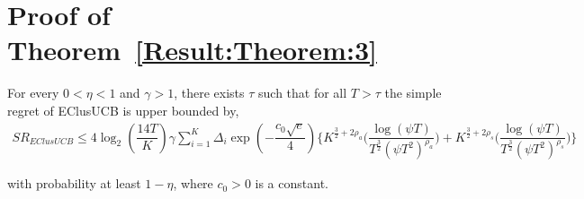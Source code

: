 

\section{Proof of Theorem~\ref{Result:Theorem:3}}
\label{App:SR_EClusUCB}
\begin{theorem}
\label{Result:Theorem:3}

For every $0<\eta <1$ and $\gamma > 1$, there exists $\tau$ such that for all $T>\tau$ the simple regret of EClusUCB is upper bounded by,
\begin{align*}
SR_{EClusUCB} \leq 4\log_{2}\left(\dfrac{14 T}{K}\right)\gamma \sum_{i=1}^{K} \Delta_{i} \exp(-\dfrac{c_{0}\sqrt{e}}{4}) \bigg\lbrace K^{\frac{3}{2} +2\rho_{a}} \bigg(\dfrac{\log (\psi T )}{T^{\frac{3}{2}}(\psi T^2)^{\rho_{a}}}\bigg) + K^{\frac{3}{2} +2\rho_{s}} \bigg(\dfrac{\log (\psi T )}{T^{\frac{3}{2}}(\psi T^2)^{\rho_{s}}}\bigg) \bigg\rbrace
\end{align*}

with probability at least $1-\eta$, where $c_{0}>0$ is a constant.

\end{theorem}


